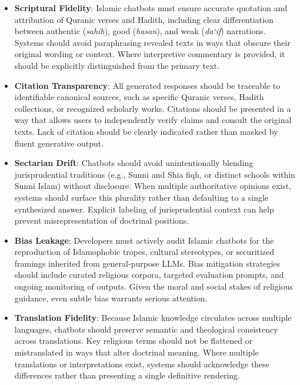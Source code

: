 \documentclass{article}
\begin{document}
\begin{itemize}

\item \textbf{Scriptural Fidelity}: 
Islamic chatbots must ensure accurate quotation and attribution of Quranic verses and Hadith, including clear differentiation between authentic (\textit{sahih}), good (\textit{hasan}), and weak (\textit{da‘if}) narrations. Systems should avoid paraphrasing revealed texts in ways that obscure their original wording or context. Where interpretive commentary is provided, it should be explicitly distinguished from the primary text.

\item \textbf{Citation Transparency}: 
All generated responses should be traceable to identifiable canonical sources, such as specific Quranic verses, Hadith collections, or recognized scholarly works. Citations should be presented in a way that allows users to independently verify claims and consult the original texts. Lack of citation should be clearly indicated rather than masked by fluent generative output.

\item \textbf{Sectarian Drift}: 
Chatbots should avoid unintentionally blending jurisprudential traditions (e.g., Sunni and Shia fiqh, or distinct schools within Sunni Islam) without disclosure. When multiple authoritative opinions exist, systems should surface this plurality rather than defaulting to a single synthesized answer. Explicit labeling of jurisprudential context can help prevent misrepresentation of doctrinal positions.

\item \textbf{Bias Leakage}: 
Developers must actively audit Islamic chatbots for the reproduction of Islamophobic tropes, cultural stereotypes, or securitized framings inherited from general-purpose LLMs. Bias mitigation strategies should include curated religious corpora, targeted evaluation prompts, and ongoing monitoring of outputs. Given the moral and social stakes of religious guidance, even subtle bias warrants serious attention.

\item \textbf{Translation Fidelity}: 
Because Islamic knowledge circulates across multiple languages, chatbots should preserve semantic and theological consistency across translations. Key religious terms should not be flattened or mistranslated in ways that alter doctrinal meaning. Where multiple translations or interpretations exist, systems should acknowledge these differences rather than presenting a single definitive rendering.
\end{itemize}
\end{document}
